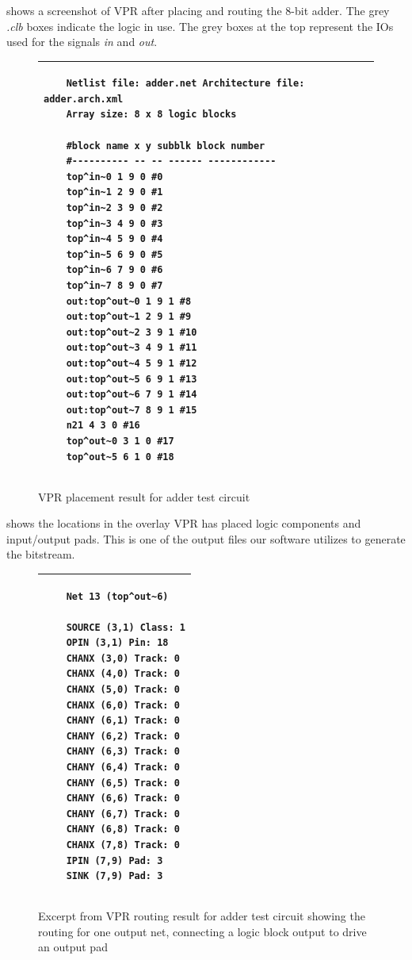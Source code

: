  shows a screenshot of VPR after placing and routing the 8-bit adder.
The grey \emph{.clb} boxes indicate the logic in use.
The grey boxes at the top represent the IOs used for the signals \emph{in} and \emph{out}.

\begin{figure}[!h]
	\centering
	\begin{tabular}{|p{13cm}|}
	\hline
	\begin{verbatim}
	Netlist file: adder.net Architecture file: adder.arch.xml
	Array size: 8 x 8 logic blocks

	#block name x y subblk block number
	#---------- -- -- ------ ------------
	top^in~0 1 9 0 #0
	top^in~1 2 9 0 #1
	top^in~2 3 9 0 #2
	top^in~3 4 9 0 #3
	top^in~4 5 9 0 #4
	top^in~5 6 9 0 #5
	top^in~6 7 9 0 #6
	top^in~7 8 9 0 #7
	out:top^out~0 1 9 1 #8
	out:top^out~1 2 9 1 #9
	out:top^out~2 3 9 1 #10
	out:top^out~3 4 9 1 #11
	out:top^out~4 5 9 1 #12
	out:top^out~5 6 9 1 #13
	out:top^out~6 7 9 1 #14
	out:top^out~7 8 9 1 #15
	n21 4 3 0 #16
	top^out~0 3 1 0 #17
	top^out~5 6 1 0 #18
	\end{verbatim}
	\\ \hline
	\end{tabular}
	\caption{VPR placement result for adder test circuit}
	\label{adder-place}
\end{figure}

 shows the locations in the overlay VPR has placed logic components and input/output pads.
This is one of the output files our software utilizes to generate the bitstream.

\begin{figure}[!h]
	\centering
	\begin{tabular}{|p{13cm}|}
	\hline
	\begin{verbatim}
	Net 13 (top^out~6)

	SOURCE (3,1) Class: 1
	OPIN (3,1) Pin: 18
	CHANX (3,0) Track: 0
	CHANX (4,0) Track: 0
	CHANX (5,0) Track: 0
	CHANX (6,0) Track: 0
	CHANY (6,1) Track: 0
	CHANY (6,2) Track: 0
	CHANY (6,3) Track: 0
	CHANY (6,4) Track: 0
	CHANY (6,5) Track: 0
	CHANY (6,6) Track: 0
	CHANY (6,7) Track: 0
	CHANY (6,8) Track: 0
	CHANX (7,8) Track: 0
	IPIN (7,9) Pad: 3
	SINK (7,9) Pad: 3
	\end{verbatim}
	\\ \hline
	\end{tabular}
	\caption{Excerpt from VPR routing result for adder test circuit showing the routing for one output net, connecting a logic block output to drive an output pad}
	\label{adder-route}
\end{figure}

